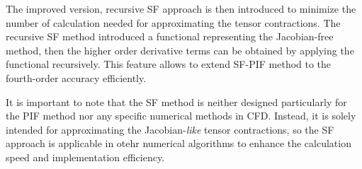 The improved version, recursive SF approach is then introduced to minimize
the number of calculation needed for approximating the tensor contractions.
The recursive SF method introduced a functional representing the Jacobian-free method,
then the higher order derivative terms can be obtained by applying the functional recursively.
This feature allows to extend SF-PIF method to the fourth-order accuracy efficiently.

It is important to note that the SF method is neither designed particularly for the PIF method
nor any specific numerical methods in CFD.
Instead, it is solely intended for approximating the Jacobian-\textit{like} tensor contractions,
so the SF approach is applicable in otehr numerical algorithms
to enhance the calculation speed and implementation efficiency.

